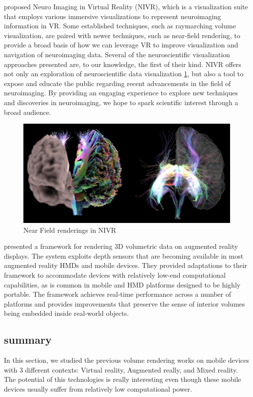\cite{7892381} proposed Neuro Imaging in Virtual Reality (NIVR), which is a visualization suite that employs various immersive visualizations to represent
neuroimaging information in VR. Some established techniques,
such as raymarching volume visualization, are paired with newer
techniques, such as near-field rendering, to provide a broad basis
of how we can leverage VR to improve visualization and
navigation of neuroimaging data. Several of the neuroscientific
visualization approaches presented are, to our knowledge, the first
of their kind.
NIVR offers not only an exploration of neuroscientific data
visualization \ref{fig:nivr}, but also a tool to expose and educate the public
regarding recent advancements in the field of neuroimaging. By
providing an engaging experience to explore new techniques and
discoveries in neuroimaging, we hope to spark scientific interest
through a broad audience. 
\begin{figure}[th]
\centering
\includegraphics[width=\textwidth]{Figures/NIVR}
\decoRule
\caption[ NIVR]{ Near Field renderings in NIVR}
\label{fig:nivr}
\end{figure}



\cite{7938241} presented a framework for rendering 3D volumetric data
on augmented reality displays. The system exploits depth
sensors that are becoming available in most augmented reality
HMDs and mobile devices. They provided adaptations to their
framework to accommodate devices with relatively low-end
computational capabilities, as is common in mobile and HMD
platforms designed to be highly portable. The framework
achieves real-time performance across a number of platforms
and provides improvements that preserve the sense of interior
volumes being embedded inside real-world objects. 

\subsection{summary}
In this section, we studied the previous volume rendering works on mobile devices with 3 different contexts: Virtual reality, Augmented really, and Mixed reality. The potential of this technologies is really interesting even though these mobile devices usually suffer from relatively low computational power.   

